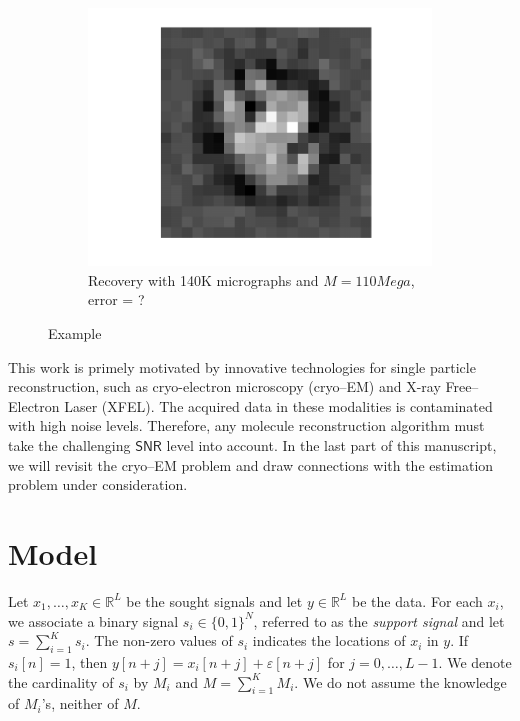 \documentclass[english,11pt]{article}
\numberwithin{equation}{section}
\theoremstyle{plain}
\theoremstyle{definition}
\theoremstyle{remark}
\theoremstyle{plain}
\theoremstyle{remark}
\theoremstyle{plain}
\theoremstyle{plain}
\newcommand{\RL}{\mathbb{R}^L}
\newcommand{\RN}{\mathbb{R}^L}
\newcommand{\SNR}{{\textsf{SNR}}}
\begin{document}
\begin{figure}[ht!]
\begin{subfigure}{.5\textwidth}
	\includegraphics[scale=0.5]{signal2D_LS_exp1}
	\caption{Recovery with 140K micrographs and $M = 110Mega$, error = ? }
	\label{fig:signal2D_RRR}
\end{subfigure}

\caption{Example}
\label{fig:example}
\end{figure}



This work is primely motivated by  innovative technologies for single particle reconstruction, such as cryo-electron microscopy (cryo--EM) and X-ray Free--Electron Laser (XFEL). The acquired data in these modalities is contaminated with high noise levels. Therefore, any molecule reconstruction algorithm must take  the challenging $\SNR$ level into account.  In the last part of this manuscript, we will revisit the cryo--EM problem and draw connections with the estimation problem under consideration.


\section{Model}  \label{sec:model}

Let $x_1,\ldots,x_K\in\RL$ be the sought signals and let $y\in\RN$ be the data. For each $x_i$, we associate a binary signal  $s_i\in\{0,1\}^N$, referred to as the \emph{support signal} and let $s = \sum_{i=1}^Ks_i$. The non-zero values of $s_i$ indicates the locations of $x_i$ in $y$. If $s_i[n]=1$, then $y[n+j] = x_i[n+j]+\varepsilon[n+j]$ for $j=0,\ldots,L-1$.
We denote the cardinality of $s_i$ by $M_i$  and $M = \sum_{i=1}^{K}M_i$. We do not assume the knowledge of $M_i$'s, neither of $M$.
\end{document}
